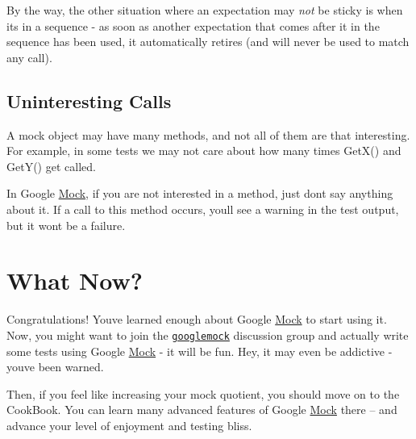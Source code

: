 By the way, the other situation where an expectation may {\itshape not} be sticky is when it\textquotesingle{}s in a sequence -\/ as soon as another expectation that comes after it in the sequence has been used, it automatically retires (and will never be used to match any call).

\subsection*{Uninteresting Calls}

A mock object may have many methods, and not all of them are that interesting. For example, in some tests we may not care about how many times {\ttfamily Get\+X()} and {\ttfamily Get\+Y()} get called.

In Google \hyperlink{classMock}{Mock}, if you are not interested in a method, just don\textquotesingle{}t say anything about it. If a call to this method occurs, you\textquotesingle{}ll see a warning in the test output, but it won\textquotesingle{}t be a failure.

\section*{What Now?}

Congratulations! You\textquotesingle{}ve learned enough about Google \hyperlink{classMock}{Mock} to start using it. Now, you might want to join the \href{http://groups.google.com/group/googlemock}{\tt googlemock} discussion group and actually write some tests using Google \hyperlink{classMock}{Mock} -\/ it will be fun. Hey, it may even be addictive -\/ you\textquotesingle{}ve been warned.

Then, if you feel like increasing your mock quotient, you should move on to the Cook\+Book. You can learn many advanced features of Google \hyperlink{classMock}{Mock} there -- and advance your level of enjoyment and testing bliss. 